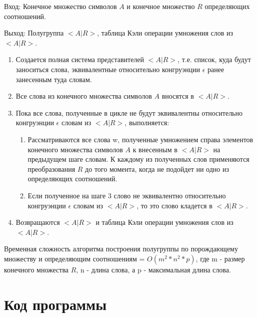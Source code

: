 \documentclass[bachelor, och, labwork]{shiza}
\begin{document}
	$\textit{Вход:}$ Конечное множество символов $A$ и конечное множество $R$ определяющих соотношений.
	
	$\textit{Выход:}$  Полугруппа $<A|R>$, таблица Кэли операции умножения слов из $<A|R>$.
	
	\begin{enumerate} 
		\item Создается полная система представителей $<A|R>$, т.е. список, куда будут заноситься слова, эквивалентные относительно конгруэнции $\epsilon$ ранее занесенным туда словам.
		\item Все слова из конечного множества символов $A$ вносятся в $<A|R>$.
		\item Пока все слова, полученные в цикле не будут эквивалентны относительно конгруэнции $\epsilon$ словам из $<A|R>$, выполняется: 
		\begin{enumerate} 
			\item Рассматриваются все слова w, полученные умножением справа элементов конечного множества символов $A$ к внесенным в $<A|R>$ на предыдущем шаге словам. К каждому из полученных слов применяются преобразования $R$ до того момента, когда не подойдет ни одно из определяющих соотношений. 
			\item Если полученное на шаге 3 слово не эквивалентно относительно конгруэнции $\epsilon$ словам из $<A|R>$, то это слово кладется в $<A|R>$.
		\end{enumerate} 
	\item Возвращаются $<A|R>$ и таблица Кэли операции умножения слов из $<A|R>$.
	\end{enumerate} 

	Временная сложность алгоритма построения полугруппы по порождающему множеству и определяющим соотношениям = $O(m^2 * n^2 * p)$, где m - размер конечного множества $R$, n - длина слова, а  p - максимальная длина слова.

	\section{Код программы}		
	
\end{document}
